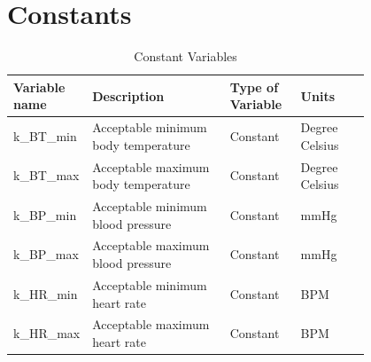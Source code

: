 \documentclass{article}
\begin{document}
	\section{Constants}
	\begin{longtable}{|l|p{0.4\linewidth}|p{0.2\linewidth}|p{0.2\linewidth}|}
	  \caption{Constant Variables}
        \hline
    \textbf{Variable name}  & \textbf{Description} & \textbf{Type of Variable} & \textbf{Units}          \\ 
    \endhead
    \hline
    k\_BT\_min & Acceptable minimum body temperature & Constant & Degree Celsius \\ \hline
    k\_BT\_max & Acceptable maximum body temperature & Constant & Degree Celsius \\ \hline
    k\_BP\_min & Acceptable minimum blood pressure & Constant & mmHg \\ \hline
    k\_BP\_max & Acceptable maximum blood pressure & Constant & mmHg \\ \hline
    k\_HR\_min & Acceptable minimum heart rate & Constant         & BPM            \\ \hline
    k\_HR\_max & Acceptable maximum heart rate & Constant         & BPM            \\ \hline
    \end{longtable}
    \newpage
\end{document}

